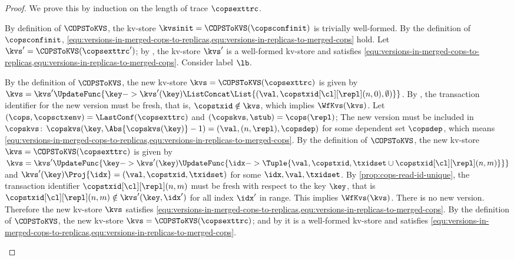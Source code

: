 \begin{proof}
We prove this by induction on the length of trace \( \copsexttrc \).
\begin{enumerate}
\Cases{\( \copsexttrc = \copsconfinit \)}
    By definition of \( \COPSToKVS \), 
    the kv-store \(\kvsinit = \COPSToKVS(\copsconfinit) \) is trivially well-formed.
    By the definition of \( \copsconfinit \), 
    \cref{equ:versions-in-merged-cops-to-replicas,equ:versions-in-replicas-to-merged-cops} hold.
    Let \( \kvs' = \COPSToKVS(\copsexttrc') \);
    by \ih, the kv-store \( \kvs' \) is a well-formed kv-store 
    and satisfies \cref{equ:versions-in-merged-cops-to-replicas,equ:versions-in-replicas-to-merged-cops}.
    Consider label \( \lb \).
    \begin{enumerate}
        By the definition of \( \COPSToKVS \), 
        the new kv-store \( \kvs = \COPSToKVS(\copsexttrc) \) is given by
        \( \kvs = \kvs'\UpdateFunc{\key -> \kvs'(\key) \ListConcat \List{(\val,\copstxid[\cl][\repl](n,0),\emptyset)}} \).
        By \rCOPSWrite, the transaction identifier for the new version must be fresh, 
        that is, \( \copstxid \notin \kvs \), which implies \( \WfKvs(\kvs) \).
        Let \( (\cops,\copsctxenv) = \LastConf(\copsexttrc) \) and \( (\copskvs, \stub) = \cops(\repl) \);
        The new version must be included in \( \copskvs \):
        \( \copskvs(\key,\Abs{\copskvs(\key)} - 1) = (\val, (n,\repl),\copsdep ) \) 
        for some dependent set \( \copsdep \),
        which means \cref{equ:versions-in-merged-cops-to-replicas,equ:versions-in-replicas-to-merged-cops}.
        By the definition of \( \COPSToKVS \), 
        the new kv-store \( \kvs = \COPSToKVS(\copsexttrc) \) is given by
        \( \kvs = \kvs'\UpdateFunc{\key -> \kvs'(\key)\UpdateFunc{\idx -> \Tuple{\val,\copstxid,\txidset \cup \copstxid[\cl][\repl](n,m)}}} \)
        and \(\kvs'(\key)\Proj{\idx} = (\val,\copstxid,\txidset)\) for some \( \idx, \val, \txidset \).
        By \cref{prop:cops-read-id-unique},
        the transaction identifier \( \copstxid[\cl][\repl](n,m) \) must be fresh with respect to the key \( \key \),
        that is \( \copstxid[\cl][\repl](n,m) \notin \kvs'(\key,\idx') \) for all index \( \idx' \) in range.
        This implies \( \WfKvs(\kvs) \).
        There is no new version.
        Therefore the new kv-store \( \kvs \) satisfies \cref{equ:versions-in-merged-cops-to-replicas,equ:versions-in-replicas-to-merged-cops}.
        By the definition of \( \COPSToKVS \), the new kv-store \( \kvs = \COPSToKVS(\copsexttrc) \);
        and by \ih it is a well-formed kv-store and satisfies \cref{equ:versions-in-merged-cops-to-replicas,equ:versions-in-replicas-to-merged-cops}.  \qedhere
    \end{enumerate}
\end{enumerate}
\end{proof}

